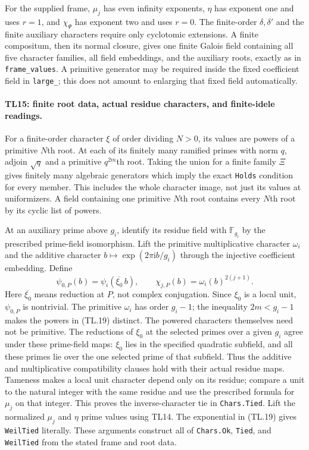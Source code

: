 \documentclass[11pt,a4paper]{article}
\numberwithin{equation}{section}
\theoremstyle{remark}\newtheorem{remark}[theorem]{Remark}
\begin{document}
For the supplied frame, $\mu_j$ has even infinity exponents,
$\eta$ has exponent one and uses $r=1$, and $\chi_\Psi$ has
exponent two and uses $r=0$. The finite-order $\delta,\delta'$
and the finite auxiliary characters require only cyclotomic
extensions. A finite compositum, then its normal closure, gives
one finite Galois field containing all five character families,
all field embeddings, and the auxiliary roots, exactly as in
\texttt{frame\_\allowbreak values}. A primitive generator may be required
inside the fixed coefficient field in \texttt{large\_}; this
does not amount to enlarging that fixed field automatically.

\paragraph{TL15: finite root data, actual residue characters, and
finite-idele readings.}
For a finite-order character $\xi$ of order dividing $N>0$, its
values are powers of a primitive $N$th root. At each of its
finitely many ramified primes with norm $q$, adjoin
$\sqrt q$ and a primitive $q^{2m}$th root. Taking the union for
a finite family $\Xi$ gives finitely many algebraic generators
which imply the exact \texttt{Holds} condition for every member.
This includes the whole character image, not just its values at
uniformizers. A field containing one primitive $N$th root
contains every $N$th root by its cyclic list of powers.

At an auxiliary prime above $g_i$, identify its residue field
with $\mathbb F_{g_i}$ by the prescribed prime-field isomorphism.
Lift the primitive multiplicative character $\omega_i$ and the
additive character $b\mapsto\exp(2\pi\mathrm i b/g_i)$ through
the injective coefficient embedding. Define
\[
 \psi_{0,P}(b)=\psi_i(\overline{\xi_0}\,b),\qquad
 \chi_{j,P}(b)=\omega_i(b)^{2(j+1)}.               \tag{TL.19}
\]
Here $\overline{\xi_0}$ means reduction at $P$, not complex
conjugation. Since $\xi_0$ is a local unit, $\psi_{0,P}$ is
nontrivial. The primitive $\omega_i$ has order $g_i-1$; the
inequality $2m<g_i-1$ makes the powers in (TL.19) distinct.
The powered characters themselves need not be primitive.
The reductions of $\xi_0$ at the selected primes over a given
$g_i$ agree under these prime-field maps: $\xi_0$ lies in the
specified quadratic subfield, and all these primes lie over
the one selected prime of that subfield. Thus the additive and
multiplicative compatibility clauses hold with their actual
residue maps. Tameness makes a local unit character depend only
on its residue; compare a unit to the natural integer with the
same residue and use the prescribed formula for $\mu_j$ on that
integer. This proves the inverse-character tie in
\texttt{Chars.Tied}. Lift the normalized $\mu_j$ and $\eta$
prime values using TL14. The exponential in (TL.19) gives
\texttt{WeilTied} literally. These arguments construct all of
\texttt{Chars.Ok}, \texttt{Tied}, and \texttt{WeilTied} from the
stated frame and root data.
\end{document}
